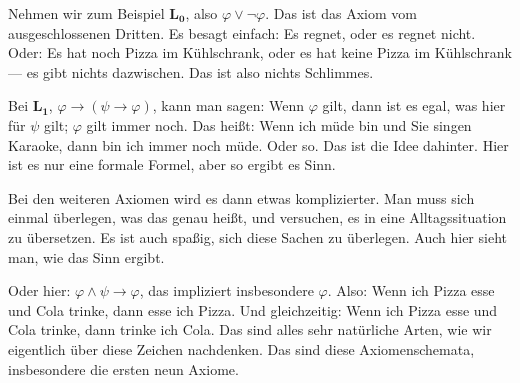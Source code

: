 \begin{spoken-clean}[01:22:52 - 01:24:37]
Nehmen wir zum Beispiel $\mathbf{L_0}$, also $\varphi \vee \neg \varphi$. Das ist das Axiom vom ausgeschlossenen Dritten. Es besagt einfach: Es regnet, oder es regnet nicht. Oder: Es hat noch Pizza im Kühlschrank, oder es hat keine Pizza im Kühlschrank --- es gibt nichts dazwischen. Das ist also nichts Schlimmes.

Bei $\mathbf{L_1}$, $\varphi \rightarrow (\psi \rightarrow \varphi)$, kann man sagen: Wenn $\varphi$ gilt, dann ist es egal, was hier für $\psi$ gilt; $\varphi$ gilt immer noch. Das heißt: Wenn ich müde bin und Sie singen Karaoke, dann bin ich immer noch müde. Oder so. Das ist die Idee dahinter. Hier ist es nur eine formale Formel, aber so ergibt es Sinn.

Bei den weiteren Axiomen wird es dann etwas komplizierter. Man muss sich einmal überlegen, was das genau heißt, und versuchen, es in eine Alltagssituation zu übersetzen. Es ist auch spaßig, sich diese Sachen zu überlegen. Auch hier sieht man, wie das Sinn ergibt.

Oder hier: $\varphi \wedge \psi \rightarrow \varphi$, das impliziert insbesondere $\varphi$. Also: Wenn ich Pizza esse und Cola trinke, dann esse ich Pizza. Und gleichzeitig: Wenn ich Pizza esse und Cola trinke, dann trinke ich Cola. Das sind alles sehr natürliche Arten, wie wir eigentlich über diese Zeichen nachdenken. Das sind diese Axiomenschemata, insbesondere die ersten neun Axiome.
\end{spoken-clean}

